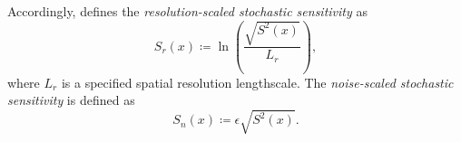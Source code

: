 Accordingly, \citet{Balasuriya_2020_StochasticSensitivityComputable} defines the \emph{resolution-scaled stochastic sensitivity} as
\begin{equation}
	S_r\left(x\right) \coloneqq \ln\left(\frac{\sqrt{S^2(x)}}{L_r}\right),
	\label{eqn:Sr_defn}
\end{equation}
where \(L_r\) is a specified spatial resolution lengthscale.
The \emph{noise-scaled stochastic sensitivity} is defined as
\begin{equation}
	S_n\left(x\right) \coloneqq \epsilon\sqrt{S^2(x)}.
	\label{eqn:Sn_defn}
\end{equation}







